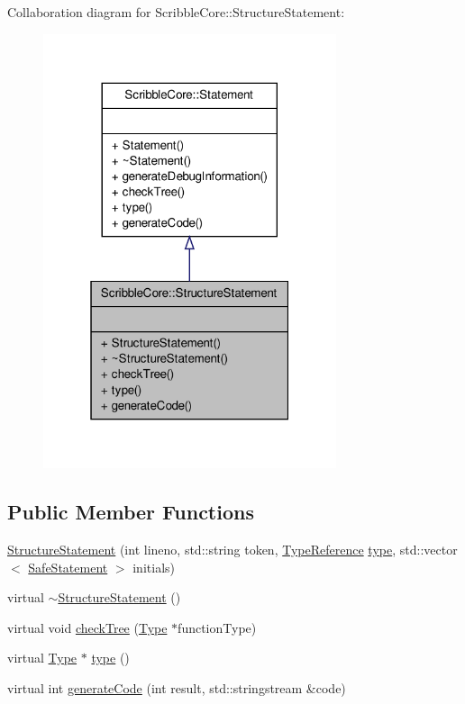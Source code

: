 Collaboration diagram for Scribble\-Core\-:\-:Structure\-Statement\-:
\nopagebreak
\begin{figure}[H]
\begin{center}
\leavevmode
\includegraphics[width=244pt]{class_scribble_core_1_1_structure_statement__coll__graph}
\end{center}
\end{figure}
\subsection*{Public Member Functions}
\begin{DoxyCompactItemize}
\item 
\hyperlink{class_scribble_core_1_1_structure_statement_af3b9e2c10dfa00ff877b0478a6b59b3b}{Structure\-Statement} (int lineno, std\-::string token, \hyperlink{namespace_scribble_core_a0e685a305b14aa5f0504df1369ba270b}{Type\-Reference} \hyperlink{class_scribble_core_1_1_structure_statement_af079e625c1bfe690339c0b4922dd152c}{type}, std\-::vector$<$ \hyperlink{namespace_scribble_core_a2ad5bf236bc9164cb56f564685f15a11}{Safe\-Statement} $>$ initials)
\item 
virtual \hyperlink{class_scribble_core_1_1_structure_statement_a92e66100bfc1af1673002d755aa16e33}{$\sim$\-Structure\-Statement} ()
\item 
virtual void \hyperlink{class_scribble_core_1_1_structure_statement_ae0d146e460d4e98800ff3d676bd9d53e}{check\-Tree} (\hyperlink{class_scribble_core_1_1_type}{Type} $\ast$function\-Type)
\item 
virtual \hyperlink{class_scribble_core_1_1_type}{Type} $\ast$ \hyperlink{class_scribble_core_1_1_structure_statement_af079e625c1bfe690339c0b4922dd152c}{type} ()
\item 
virtual int \hyperlink{class_scribble_core_1_1_structure_statement_a55d89fd9d10c1f5885da232a435014ab}{generate\-Code} (int result, std\-::stringstream \&code)
\end{DoxyCompactItemize}


